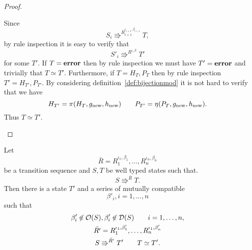 \begin{proof}
\begin{description}
      Since
      \begin{equation}
        S_i \Rrightarrow^{R_{i+1}^{\iota_{i+1}, \beta_{i+1}}} T,
      \end{equation}
      by rule inspection it is easy to verify that
      \begin{equation}
        S'_i \Rrightarrow^{R^{\iota, \beta}} T'
      \end{equation}
      for some $T'$. If $T = \mbox{{\bf error}}$ then by rule inspection we must have $T' =
      \mbox{{\bf error}}$ and trivially that $T \simeq T'$. Furthermore, if $T = H_{T},
      P_{T}$ then by rule inspection $T' = H_{T'}, P_{T'}$. By considering
      definition~\ref{def:bijectionmod} it is not hard to verify that
      we have
      \begin{equation*}
        H_{T'} = \pi(H_T, g_{\text{new}}, h_{\text{new}}) \quad\quad P_{T'} =
        \eta(P_T, g_{\text{new}}, h_{\text{new}}).
      \end{equation*}
      Thus $T \simeq T'$.
  \end{description}
\end{proof}

\begin{lemma} \label{lem:lemma4}
  Let 
  \begin{equation*}
    \bar{R} = R_1^{\iota_1, \beta_1}, \dots, R_n^{\iota_n, \beta_n}
  \end{equation*}
  be a transition sequence and $S, T$ be well typed states such that.
  \begin{equation*}
    S \Rrightarrow^{\bar{R}} T.
  \end{equation*}
  Then there is a state $T'$ and a series of mutually compatible 
  \begin{equation*}
    \beta'_i, i = 1, \dots, n
  \end{equation*}
  such that
  \begin{equation*}
    \begin{gathered}
      \beta'_i \not\in \mathcal{O}(S), \beta'_i \not\in \mathcal{D}(S) \quad\quad i =
      1, \dots, n, \\
      \bar{R'} = R_1^{\iota_1, \beta'_1}, \dots, R_n^{\iota_1, \beta'_n} \\
      S \Rrightarrow^{\bar{R'}} T' \quad\quad T \simeq T'.
    \end{gathered}
  \end{equation*}
\end{lemma}

